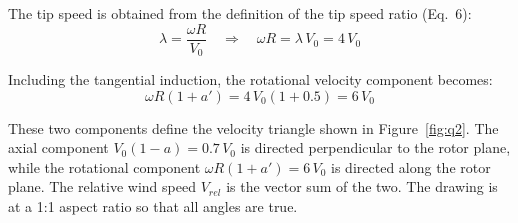 The tip speed is obtained from the definition of the tip speed ratio (Eq.~6):
%
\begin{equation*}
    \lambda = \frac{\omega R}{V_0} \quad \Longrightarrow \quad \omega R = \lambda\, V_0 = 4\, V_0
\end{equation*}

Including the tangential induction, the rotational velocity component becomes:
%
\begin{equation*}
    \omega R(1+a') = 4\, V_0(1 + 0.5) = 6\, V_0
\end{equation*}

These two components define the velocity triangle shown in Figure~\ref{fig:q2}. The axial component $V_0(1-a) = 0.7\,V_0$ is directed perpendicular to the rotor plane, while the rotational component $\omega R(1+a') = 6\,V_0$ is directed along the rotor plane. The relative wind speed $V_{rel}$ is the vector sum of the two. The drawing is at a 1:1 aspect ratio so that all angles are true.

